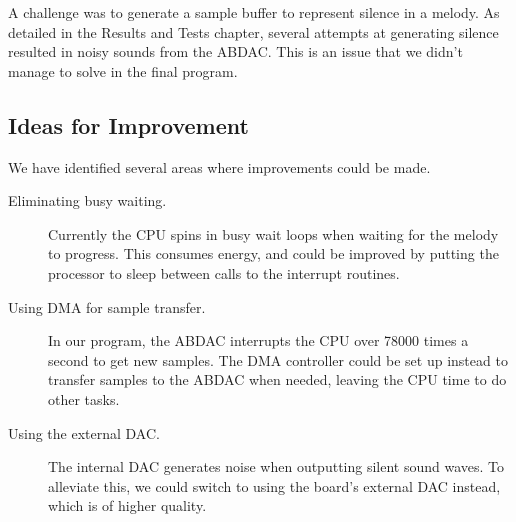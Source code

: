 A challenge was to generate a sample buffer to represent silence in a
melody. As detailed in the Results and Tests chapter, several attempts
at generating silence resulted in noisy sounds from the ABDAC. This is
an issue that we didn't manage to solve in the final program.

\subsection{Ideas for Improvement}

We have identified several areas where improvements could be made.

\begin{description}
    \item [Eliminating busy waiting.]
        Currently the CPU spins in busy wait loops when waiting for the
        melody to progress. This consumes energy, and could be improved
        by putting the processor to sleep between calls to the interrupt
        routines.
    \item [Using DMA for sample transfer.]
        In our program, the ABDAC interrupts the CPU over 78000 times a
        second to get new samples. The DMA controller could be set up
        instead to transfer samples to the ABDAC when needed, leaving
        the CPU time to do other tasks.
    \item [Using the external DAC.]
        The internal DAC generates noise when outputting silent sound
        waves. To alleviate this, we could switch to using the board's
        external DAC instead, which is of higher quality. \cite{comp}
\end{description}
